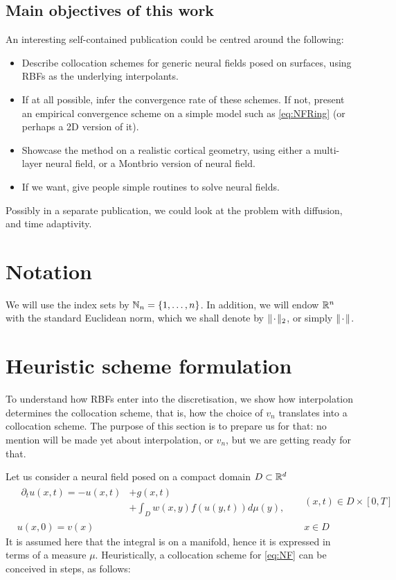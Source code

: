 \documentclass[a4paper]{siamart190516}
\begin{document}
\subsection{Main objectives of this work}\label{ssec:Objectives} An interesting
self-contained publication could be centred around the following:
\begin{itemize}
  \item Describe collocation schemes for generic neural fields posed on surfaces,
    using RBFs as the underlying interpolants.
  \item If at all possible, infer the convergence rate of these schemes. If not,
    present an empirical convergence scheme on a simple model such as
    \cref{eq:NFRing} (or perhaps a 2D version of it).
  \item Showcase the method on a realistic cortical geometry, using either a
    multi-layer neural field, or a Montbrio version of neural field.
  \item If we want, give people simple routines to solve neural fields.
\end{itemize}
Possibly in a separate publication, we could look at the problem with diffusion, and
time adaptivity.

\section{Notation}\label{sec:notation} We will use the index sets by $\mathbb{N}_n = \{
1,\ldots, n\}$. In addition, we will endow $\mathbb{R}^n$ with the standard Euclidean
norm, which we shall denote by $\|{\mkern 2mu\cdot\mkern 2mu}\|_2$, or simply $\| {\mkern 2mu\cdot\mkern 2mu} \|$.

\section{Heuristic scheme formulation}\label{sec:model} To understand how RBFs enter
into the discretisation, we show how interpolation determines the collocation scheme,
that is, how the choice of $v_n$ translates into a collocation scheme. The purpose of
this section is to prepare us for that: no mention will be made yet about
interpolation, or $v_n$, but we are getting ready for that.

Let us consider a neural field posed on
a compact domain $D \subset \mathbb{R}^d$
\begin{equation}\label{eq:NF}
  \begin{aligned}
  &
  \begin{aligned}
    \partial_t u(x,t) =  -u(x,t)  &+ g(x,t) \\
                & + \int_{D} w(x,y) f(u(y,t))d \mu(y),
  \end{aligned}
  && (x,t) \in D \times [0,T] \\
  & u(x,0) = v(x) && x \in D 
  \end{aligned}
\end{equation}
It is assumed here that the integral is on a manifold, hence it is expressed in terms
of a measure $\mu$. Heuristically, a collocation scheme for \cref{eq:NF} can be conceived
in steps, as follows:
\end{document}
